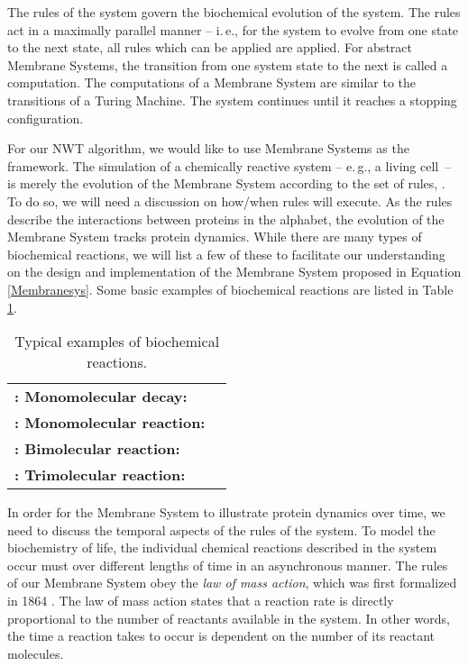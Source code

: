 \documentclass[copyright]{eptcs}
\begin{document}
The rules of the system govern the biochemical evolution of the system.  The rules act in a maximally parallel manner -- i.\,e., for the system to evolve from one state to the next state, all rules which can be applied are applied.  For abstract Membrane Systems, the transition from one system state to the next is called a computation.  The computations of a Membrane System are similar to the transitions of a Turing Machine.  The system continues until it reaches a stopping configuration.  





For our NWT algorithm, we would like to use Membrane Systems as the framework.  The simulation of a chemically reactive system -- e.\,g., a living cell~-- is merely the evolution of the Membrane System according to the set of rules, .  To do so, we will need a discussion on how/when rules will execute.   As the rules describe the interactions between proteins in the alphabet, the evolution of the Membrane System tracks protein dynamics.  While there are many types of biochemical reactions, we will list a few of these to facilitate our understanding on the design and implementation of the Membrane System proposed in Equation \ref{Membranesys}.  Some basic examples of biochemical reactions are listed in Table \ref{basicex}.

{\renewcommand{\arraystretch}{1.2}\begin{table}[h!b!p!]
\centering
\caption[Typical examples of biochemical reactions]{Typical examples of biochemical reactions.} \label{basicex}
\begin{tabular}{lc}
\hline
{\bf : Monomolecular decay:} & \\
{\bf : Monomolecular reaction:} & \\
{\bf : Bimolecular reaction:} & \\
{\bf : Trimolecular reaction:} & \\
\hline
\end{tabular}
\end{table}}

In order for the Membrane System to illustrate protein dynamics over time, we need to discuss the temporal aspects of the rules of the system.  To model the biochemistry of life, the individual chemical reactions described in the system occur must over different lengths of time in an asynchronous manner.  The rules of our Membrane System obey the \emph{law of mass action}, which was first formalized in 1864 \cite{guldberg1864ii,guldberg1864i,waage1864}.  The law of mass action states that a reaction rate is directly proportional to the number of reactants available in the system.  In other words, the time a reaction takes to occur is dependent on the number of its reactant molecules.
\end{document}
